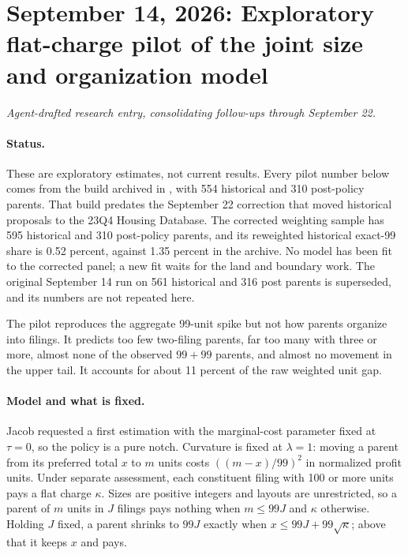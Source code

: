 \clearpage
\section*{September 14, 2026: Exploratory flat-charge pilot of the joint size and organization model}
\textit{Agent-drafted research entry, consolidating follow-ups through
September 22.}


\paragraph{Status.} These are exploratory estimates, not current results.
Every pilot number below comes from the build archived in
, with 554 historical and
310 post-policy parents. That build predates the September 22 correction that
moved historical proposals to the 23Q4 Housing Database. The corrected
weighting sample has 595 historical and 310 post-policy
parents, and its reweighted historical exact-99 share is 0.52 percent,
against 1.35 percent in the archive. No model has been fit to the corrected
panel; a new fit waits for the land and boundary work. The original September
14 run on 561 historical and 316 post parents is superseded, and its numbers
are not repeated here.

The pilot reproduces the aggregate 99-unit spike but not how parents organize
into filings. It predicts too few two-filing parents, far too many with three
or more, almost none of the observed $99+99$ parents, and almost no movement in
the upper tail. It accounts for about 11 percent of the raw weighted unit gap.

\paragraph{Model and what is fixed.} Jacob requested a first estimation with
the marginal-cost parameter fixed at $\tau=0$, so the policy is a pure notch.
Curvature is fixed at $\lambda=1$: moving a parent from its preferred total $x$
to $m$ units costs $((m-x)/99)^2$ in normalized profit units. Under separate
assessment, each constituent filing with 100 or more units pays a flat charge
$\kappa$. Sizes are positive integers and layouts are unrestricted, so a parent
of $m$ units in $J$ filings pays nothing when $m\le 99J$ and $\kappa$
otherwise. Holding $J$ fixed, a parent shrinks to $99J$ exactly when
$x\le 99J+99\sqrt{\kappa}$; above that it keeps $x$ and pays.

